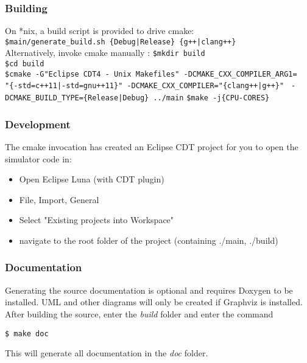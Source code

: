 \subsubsection{Building}
On *nix, a build script is provided to drive cmake:\\
\lstinline!$main/generate_build.sh {Debug|Release} {g++|clang++}!\\
Alternatively, invoke cmake manually :
\lstinline!$mkdir build!\\
\lstinline!$cd build!\\
\lstinline!$cmake -G"Eclipse CDT4 - Unix Makefiles" -DCMAKE_CXX_COMPILER_ARG1=!\\
\lstinline!"{-std=c++11|-std=gnu++11}" -DCMAKE_CXX_COMPILER="{clang++|g++}" !
\lstinline!-DCMAKE_BUILD_TYPE={Release|Debug} ../main!
\lstinline!$make -j{CPU-CORES}!\\
\subsubsection{Development}
The cmake invocation has created an Eclipse CDT project for you to open the simulator code in:
\begin{itemize}
  \item Open Eclipse Luna (with CDT plugin)
  \item File, Import, General
  \item Select "Existing projects into Workspace"
  \item navigate to the root folder of the project (containing ./main, ./build)
\end{itemize}

\subsubsection{Documentation}
Generating the source documentation is optional and requires Doxygen to be installed. UML and other diagrams will only be created if Graphviz is installed.\\
After building the source, enter the \textsl{build} folder and enter the command 
\begin{verbatim}
$ make doc
\end{verbatim} This will generate all documentation in the \textsl{doc} folder.